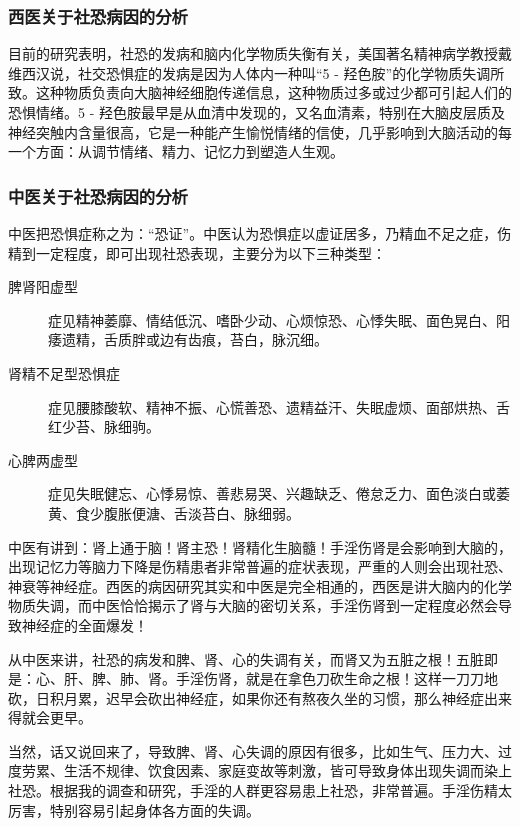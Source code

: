 \documentclass{ctexart}
\begin{document}
\subsubsection{西医关于社恐病因的分析}

目前的研究表明，社恐的发病和脑内化学物质失衡有关，美国著名精神病学教授戴维西汉说，社交恐惧症的发病是因为人体内一种叫“5 - 羟色胺”的化学物质失调所致。这种物质负责向大脑神经细胞传递信息，这种物质过多或过少都可引起人们的恐惧情绪。5 - 羟色胺最早是从血清中发现的，又名血清素，特别在大脑皮层质及神经突触内含量很高，它是一种能产生愉悦情绪的信使，几乎影响到大脑活动的每一个方面：从调节情绪、精力、记忆力到塑造人生观。

\subsubsection{中医关于社恐病因的分析}

中医把恐惧症称之为：“恐证”。中医认为恐惧症以虚证居多，乃精血不足之症，伤精到一定程度，即可出现社恐表现，主要分为以下三种类型：

\begin{description}
    \item[脾肾阳虚型] 症见精神萎靡、情结低沉、嗜卧少动、心烦惊恐、心悸失眠、面色晃白、阳痿遗精，舌质胖或边有齿痕，苔白，脉沉细。
    \item[肾精不足型恐惧症] 症见腰膝酸软、精神不振、心慌善恐、遗精益汗、失眠虚烦、面部烘热、舌红少苔、脉细驹。
    \item[心脾两虚型] 症见失眠健忘、心悸易惊、善悲易哭、兴趣缺乏、倦怠乏力、面色淡白或萎黄、食少腹胀便溏、舌淡苔白、脉细弱。
\end{description}

中医有讲到：肾上通于脑！肾主恐！肾精化生脑髓！手淫伤肾是会影响到大脑的，出现记忆力等脑力下降是伤精患者非常普遍的症状表现，严重的人则会出现社恐、神衰等神经症。西医的病因研究其实和中医是完全相通的，西医是讲大脑内的化学物质失调，而中医恰恰揭示了肾与大脑的密切关系，手淫伤肾到一定程度必然会导致神经症的全面爆发！

从中医来讲，社恐的病发和脾、肾、心的失调有关，而肾又为五脏之根！五脏即是：心、肝、脾、肺、肾。手淫伤肾，就是在拿色刀砍生命之根！这样一刀刀地砍，日积月累，迟早会砍出神经症，如果你还有熬夜久坐的习惯，那么神经症出来得就会更早。

当然，话又说回来了，导致脾、肾、心失调的原因有很多，比如生气、压力大、过度劳累、生活不规律、饮食因素、家庭变故等刺激，皆可导致身体出现失调而染上社恐。根据我的调查和研究，手淫的人群更容易患上社恐，非常普遍。手淫伤精太厉害，特别容易引起身体各方面的失调。
\end{document}
